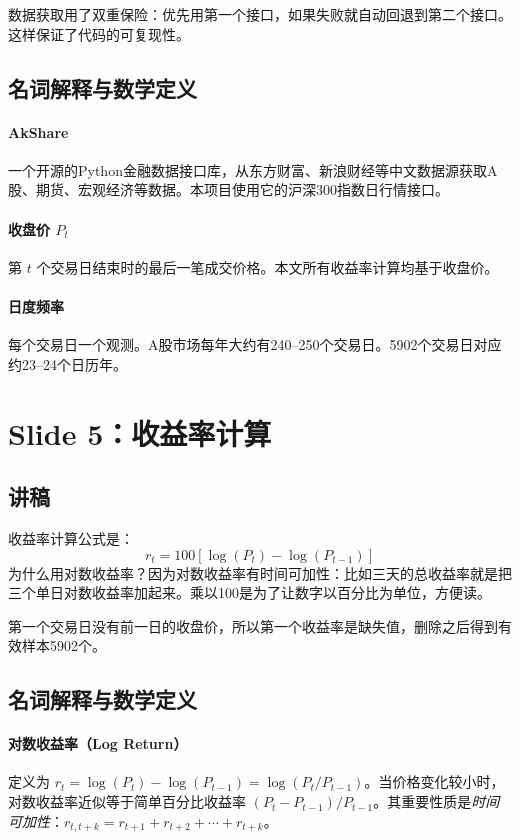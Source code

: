 \documentclass[11pt,a4paper]{article}
\begin{document}
数据获取用了双重保险：优先用第一个接口，如果失败就自动回退到第二个接口。这样保证了代码的可复现性。

\subsection*{名词解释与数学定义}

\paragraph{AkShare} 一个开源的Python金融数据接口库，从东方财富、新浪财经等中文数据源获取A股、期货、宏观经济等数据。本项目使用它的沪深300指数日行情接口。

\paragraph{收盘价 \(P_t\)} 第 \(t\) 个交易日结束时的最后一笔成交价格。本文所有收益率计算均基于收盘价。

\paragraph{日度频率} 每个交易日一个观测。A股市场每年大约有240--250个交易日。5902个交易日对应约23--24个日历年。

\newpage
\section*{Slide 5：收益率计算}

\subsection*{讲稿}
收益率计算公式是：
\[
r_t = 100[\log(P_t) - \log(P_{t-1})]
\]
为什么用对数收益率？因为对数收益率有时间可加性：比如三天的总收益率就是把三个单日对数收益率加起来。乘以100是为了让数字以百分比为单位，方便读。

第一个交易日没有前一日的收盘价，所以第一个收益率是缺失值，删除之后得到有效样本5902个。

\subsection*{名词解释与数学定义}

\paragraph{对数收益率（Log Return）} 定义为 \(r_t = \log(P_t) - \log(P_{t-1}) = \log(P_t / P_{t-1})\)。当价格变化较小时，对数收益率近似等于简单百分比收益率 \((P_t - P_{t-1}) / P_{t-1}\)。其重要性质是\emph{时间可加性}：\(r_{t,t+k} = r_{t+1} + r_{t+2} + \cdots + r_{t+k}\)。
\end{document}
